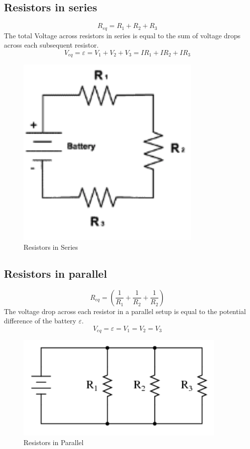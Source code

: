 \documentclass[titlepage]{article}
\begin{document}
    \subsection*{Resistors in series}
        $$R_{eq} = R_1 +R_2 + R_3 $$
        The total Voltage across resistors in series is equal to the sum of voltage drops across each subsequent resistor. $$ V_{eq} = \varepsilon = V_1 + V_2 + V_3 = I R_1 + I R_2 + I R_3 $$
    \begin{figure}[hbt!]
        \centering
        \caption{Resistors in Series}
        \includegraphics[scale = 0.3]{exanal/series}
    \end{figure} 

    \subsection*{Resistors in parallel} 
        $$R_{eq} = \left( \frac{1}{R_1} + \frac{1}{R_2} + \frac{1}{R_2} \right)  $$
        The voltage drop across each resistor in a parallel setup is equal to the potential difference of the battery $\varepsilon$.
        $$V_{eq} = \varepsilon = V_1 = V_2 = V_3 $$

    \begin{figure}[hbt!]
        \centering
        \caption{Resistors in Parallel}
        \includegraphics[scale=0.3]{exanal/parallel}
    \end{figure} 
\end{document}

